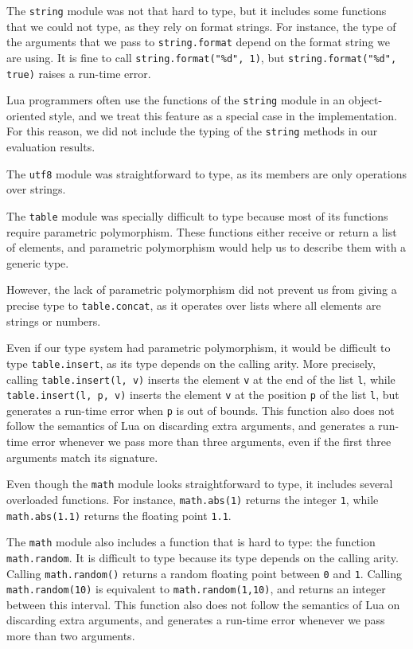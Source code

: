 The \texttt{string} module was not that hard to type, but it includes
some functions that we could not type, as they rely on format
strings.
For instance, the type of the arguments that we pass to
\texttt{string.format} depend on the format string we are using.
It is fine to call \texttt{string.format("\%d", 1)}, but
\texttt{string.format("\%d", true)} raises a run-time error.

Lua programmers often use the functions of the \texttt{string} module
in an object-oriented style, and we treat this feature as a
special case in the implementation.
For this reason, we did not include the typing of the \texttt{string}
methods in our evaluation results.

The \texttt{utf8} module was straightforward to type,
as its members are only operations over strings.

The \texttt{table} module was specially difficult to type because
most of its functions require parametric polymorphism.
These functions either receive or return a list of elements, and
parametric polymorphism would help us to describe them with a generic type.

However, the lack of parametric polymorphism did not prevent us from
giving a precise type to \texttt{table.concat}, as it operates over lists
where all elements are strings or numbers.

Even if our type system had parametric polymorphism, it would
be difficult to type \texttt{table.insert}, as its type depends on
the calling arity.
More precisely, calling \texttt{table.insert(l, v)} inserts the
element \texttt{v} at the end of the list \texttt{l},
while \texttt{table.insert(l, p, v)} inserts the element \texttt{v}
at the position \texttt{p} of the list \texttt{l},
but generates a run-time error when \texttt{p} is out of bounds.
This function also does not follow the semantics of Lua on
discarding extra arguments, and generates a run-time error whenever
we pass more than three arguments, even if the first three arguments
match its signature.

Even though the \texttt{math} module looks straightforward to type,
it includes several overloaded functions.
For instance, \texttt{math.abs(1)} returns the integer \texttt{1},
while \texttt{math.abs(1.1)} returns the floating point \texttt{1.1}.

The \texttt{math} module also includes a function that is hard to type:
the function \texttt{math.random}.
It is difficult to type because its type depends on the calling arity.
Calling \texttt{math.random()} returns a random floating point
between \texttt{0} and \texttt{1}.
Calling \texttt{math.random(10)} is equivalent to \texttt{math.random(1,10)},
and returns an integer between this interval.
This function also does not follow the semantics of Lua on discarding extra arguments,
and generates a run-time error whenever we pass more than two arguments.

